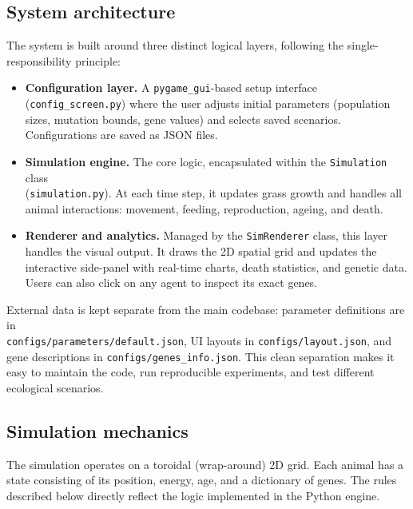 \documentclass[english]{projectreport}
\begin{document}
\subsection{System architecture}
\label{sec:architecture}

The system is built around three distinct logical layers, following the single-responsibility principle:

\begin{itemize}
    \item \textbf{Configuration layer.} A \texttt{pygame\_gui}-based setup interface (\texttt{config\_screen.py}) where the user adjusts initial parameters (population sizes, mutation bounds, gene values) and selects saved scenarios. Configurations are saved as JSON files.
    \item \textbf{Simulation engine.} The core logic, encapsulated within the \texttt{Simulation} class \\ (\texttt{simulation.py}). At each time step, it updates grass growth and handles all animal interactions: movement, feeding, reproduction, ageing, and death.
    \item \textbf{Renderer and analytics.} Managed by the \texttt{SimRenderer} class, this layer handles the visual output. It draws the 2D spatial grid and updates the interactive side-panel with real-time charts, death statistics, and genetic data. Users can also click on any agent to inspect its exact genes.
\end{itemize}

External data is kept separate from the main codebase: parameter definitions are in \\ \texttt{configs/parameters/default.json}, UI layouts in \texttt{configs/layout.json}, and gene descriptions in \texttt{configs/genes\_info.json}. This clean separation makes it easy to maintain the code, run reproducible experiments, and test different ecological scenarios.


\subsection{Simulation mechanics}
\label{sec:equations}

The simulation operates on a toroidal (wrap-around) 2D grid. Each animal has a state consisting of its position, energy, age, and a dictionary of genes. The rules described below directly reflect the logic implemented in the Python engine.
\end{document}
